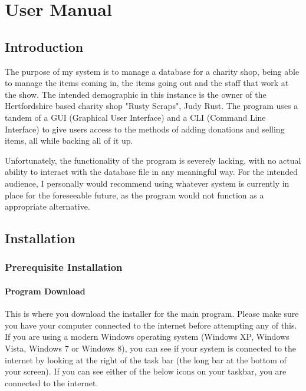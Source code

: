 \chapter{User Manual}

\section{Introduction}
The purpose of my system is to manage a database for a charity shop, being able to manage the items coming in, the items going out and the staff that work at the show. The intended demographic in this instance is the owner of the Hertfordshire based charity shop "Rusty Scraps", Judy Rust. The program uses a tandem of a GUI (Graphical User Interface) and a CLI (Command Line Interface) to give users access to the methods of adding donations and selling items, all while backing all of it up.

Unfortunately, the functionality of the program is severely lacking, with no actual ability to interact with the database file in any meaningful way. For the intended audience, I personally would recommend using whatever system is currently in place for the foreseeable future, as the program would not function as a appropriate alternative.

\section{Installation}

\subsection{Prerequisite Installation}


\subsubsection{Program Download}
This is where you download the installer for the main program. Please make sure you have your computer connected to the internet before attempting any of this. If you are using a modern Windows operating system (Windows XP, Windows Vista, Windows 7 or Windows 8), you can see if your system is connected to the internet by looking at the right of the task bar (the long bar at the bottom of your screen). If you can see either of the below icons on your taskbar, you are connected to the internet.

